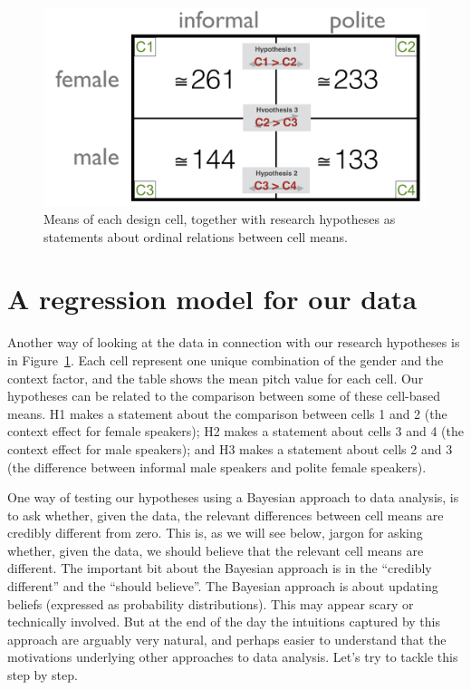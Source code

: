 \documentclass[nobib]{tufte-handout}
\begin{document}
\begin{figure}[h]
  \centering
    \includegraphics[width = \textwidth]{pics/table_mean_hypotheses.png}
    \caption{Means of each design cell, together with research hypotheses as statements about ordinal relations between cell means.}
    \label{fig:BasicPlotData_table}
\end{figure}

\section{A regression model for our data}

Another way of looking at the data in connection with our research hypotheses is in Figure~\ref{fig:BasicPlotData_table}. Each cell represent one unique combination of the gender and the context factor, and the table shows the mean pitch value for each cell.
Our hypotheses can be related to the comparison between some of these cell-based means.
H1 makes a statement about the comparison between cells 1 and 2 (the context effect for female speakers); H2 makes a statement about cells 3 and 4 (the context effect for male speakers); and H3 makes a statement about cells 2 and 3 (the difference between informal male speakers and polite female speakers).

One way of testing our hypotheses using a Bayesian approach to data analysis, is to ask whether, given the data, the relevant differences between cell means are credibly different from zero. This is, as we will see below, jargon for asking whether, given the data, we should believe that the relevant cell means are different. The important bit about the Bayesian approach is in the ``credibly different'' and the ``should believe''. The Bayesian approach is about updating beliefs (expressed as probability distributions). This may appear scary or technically involved. But at the end of the day the intuitions captured by this approach are arguably very natural, and perhaps easier to understand that the motivations underlying other approaches to data analysis. Let's try to tackle this step by step.
\end{document}

